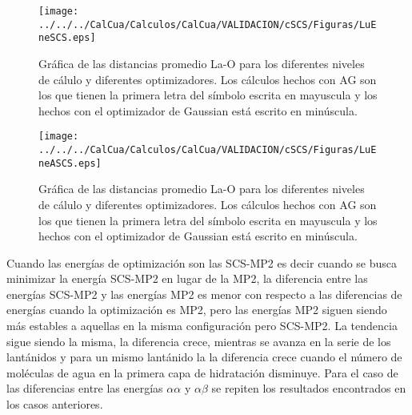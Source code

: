 \begin{figure}[h]
\centering
\texttt{[image: ../../../CalCua/Calculos/CalCua/VALIDACION/cSCS/Figuras/LuEneSCS.eps]}
\caption{\small{Gr\'afica de las distancias promedio La-O para los
diferentes niveles de c\'alulo y diferentes optimizadores. Los 
c\'alculos hechos con AG son los que tienen la primera letra del 
s\'imbolo escrita en mayuscula y los hechos con el optimizador de 
Gaussian est\'a escrito en min\'uscula.}}
\label{fig13}
\end{figure}
\begin{figure}[h]
\centering
\texttt{[image: ../../../CalCua/Calculos/CalCua/VALIDACION/cSCS/Figuras/LuEneASCS.eps]}
\caption{\small{Gr\'afica de las distancias promedio La-O para los
diferentes niveles de c\'alulo y diferentes optimizadores. Los 
c\'alculos hechos con AG son los que tienen la primera letra del 
s\'imbolo escrita en mayuscula y los hechos con el optimizador de 
Gaussian est\'a escrito en min\'uscula.}}
\label{fig131}
\end{figure}
Cuando las energ\'ias de optimizaci\'on son las SCS-MP2 es decir
cuando se busca minimizar la energ\'ia SCS-MP2 en lugar de la MP2, la
diferencia entre las energ\'ias SCS-MP2 y las energ\'ias MP2 es menor
con respecto a las diferencias de energ\'ias cuando la optimizaci\'on
es MP2, pero las energ\'ias MP2 siguen siendo m\'as estables a 
aquellas en la misma configuraci\'on pero SCS-MP2. La tendencia sigue
siendo la misma, la diferencia crece, mientras se avanza en la serie
de los lant\'anidos y para un mismo lant\'anido la la diferencia 
crece cuando el n\'umero de mol\'eculas de agua en la primera capa de
hidrataci\'on disminuye. Para el caso de las diferencias entre las
energ\'ias $\alpha\alpha$ y $\alpha\beta$ se repiten los resultados
encontrados en los casos anteriores.

